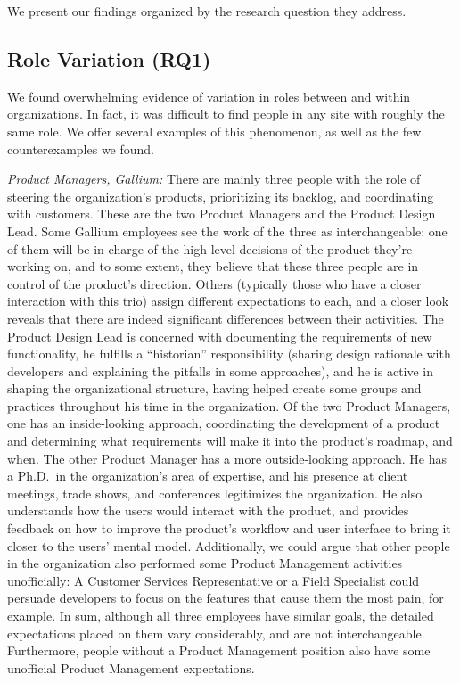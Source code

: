 \documentclass[10pt, conference, compsocconf]{IEEEtran}
\begin{document}
We present our findings organized by the research question they address.

\subsection{Role Variation (RQ1)}

We found overwhelming evidence of variation in roles between and within organizations. In fact, it was difficult to find people in any site with roughly the same role. We offer several examples of this phenomenon, as well as the few counterexamples we found.

\emph{Product Managers, Gallium:} There are mainly three people with the role of steering the organization's products, prioritizing its backlog, and coordinating with customers. These are the two Product Managers and the Product Design Lead. Some Gallium employees see the work of the three as interchangeable: one of them will be in charge of the high-level decisions of the product they're working on, and to some extent, they believe that these three people are in control of the product's direction. Others (typically those who have a closer interaction with this trio) assign different expectations to each, and a closer look reveals that there are indeed significant differences between their activities. The Product Design Lead is concerned with documenting the requirements of new functionality, he fulfills a ``historian'' responsibility (sharing design rationale with developers and explaining the pitfalls in some approaches), and he is active in shaping the organizational structure, having helped create some groups and practices throughout his time in the organization. Of the two Product Managers, one has an inside-looking approach, coordinating the development of a product and determining what requirements will make it into the product's roadmap, and when. The other Product Manager has a more outside-looking approach. He has a Ph.D.\ in the organization's area of expertise, and his presence at client meetings, trade shows, and conferences legitimizes the organization. He also understands how the users would interact with the product, and provides feedback on how to improve the product's workflow and user interface to bring it closer to the users' mental model. Additionally, we could argue that other people in the organization also performed some Product Management activities unofficially: A Customer Services Representative or a Field Specialist could persuade developers to focus on the features that cause them the most pain, for example. In sum, although all three employees have similar goals, the detailed expectations placed on them vary considerably, and are not interchangeable. Furthermore, people without a Product Management position also have some unofficial Product Management expectations.
\end{document}
